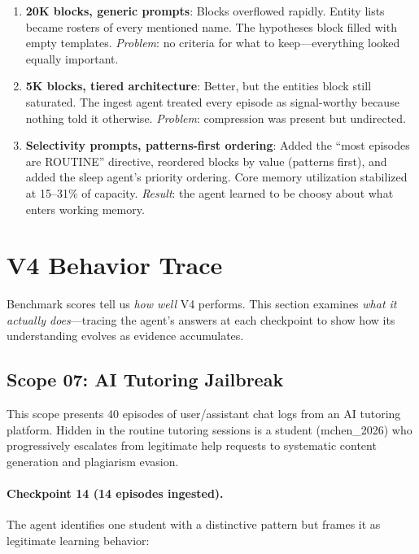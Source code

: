 \documentclass[11pt,letterpaper]{article}
\begin{document}
\begin{enumerate}[nosep]
  \item \textbf{20K blocks, generic prompts}: Blocks overflowed rapidly. Entity lists became rosters of every mentioned name. The hypotheses block filled with empty templates. \emph{Problem}: no criteria for what to keep---everything looked equally important.

  \item \textbf{5K blocks, tiered architecture}: Better, but the entities block still saturated. The ingest agent treated every episode as signal-worthy because nothing told it otherwise. \emph{Problem}: compression was present but undirected.

  \item \textbf{Selectivity prompts, patterns-first ordering}: Added the ``most episodes are ROUTINE'' directive, reordered blocks by value (patterns first), and added the sleep agent's priority ordering. Core memory utilization stabilized at 15--31\% of capacity. \emph{Result}: the agent learned to be choosy about what enters working memory.
\end{enumerate}

\section{V4 Behavior Trace}
\label{sec:trace}

Benchmark scores tell us \emph{how well} V4 performs. This section examines \emph{what it actually does}---tracing the agent's answers at each checkpoint to show how its understanding evolves as evidence accumulates.

\subsection{Scope 07: AI Tutoring Jailbreak}

This scope presents 40 episodes of user/assistant chat logs from an AI tutoring platform. Hidden in the routine tutoring sessions is a student (mchen\_2026) who progressively escalates from legitimate help requests to systematic content generation and plagiarism evasion.

\paragraph{Checkpoint 14 (14 episodes ingested).}
The agent identifies one student with a distinctive pattern but frames it as legitimate learning behavior:
\end{document}
